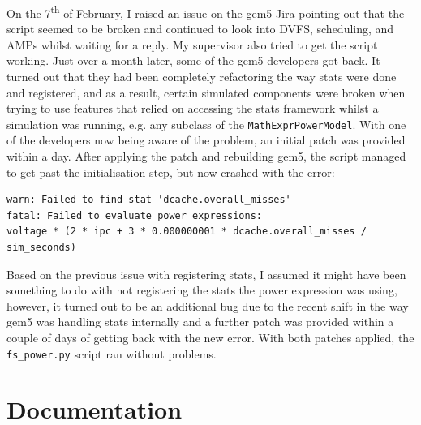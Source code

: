 On the 7\textsuperscript{th} of February, I raised an issue on the gem5 Jira 
pointing out that the script seemed to be broken \cite{hansen_gem5-319_2020} and
continued to look into DVFS, scheduling, and AMPs whilst waiting for a reply. My
supervisor also tried to get the script working. Just over a month later, some
of the gem5 developers got back. It turned out that they had been completely 
refactoring the way stats were done and registered, and as a result, certain 
simulated components were broken when trying to use features that relied on 
accessing the stats framework whilst a simulation was running, e.g. any 
subclass of the \texttt{MathExprPowerModel}. With one of the developers now 
being aware of the problem, an initial patch was provided within a day. After 
applying the patch and rebuilding gem5, the script managed to get past the 
initialisation step, but now crashed with the error:
\begin{lstlisting}[basicstyle=\sffamily\footnotesize]
warn: Failed to find stat 'dcache.overall_misses'
fatal: Failed to evaluate power expressions:
voltage * (2 * ipc + 3 * 0.000000001 * dcache.overall_misses / sim_seconds)
\end{lstlisting}
Based on the previous issue with registering stats, I assumed it might have been
something to do with not registering the stats the power expression was using, 
however, it turned out to be an additional bug due to the recent shift in the 
way gem5 was handling stats internally and a further patch was provided within 
a couple of days of getting back with the new error. With both patches applied, 
the \texttt{fs\_power.py} script ran without problems.

\section{Documentation}
